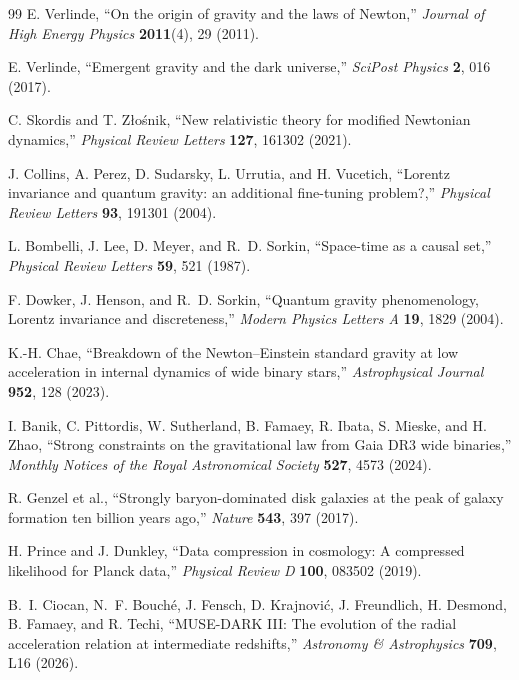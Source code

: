 \documentclass[11pt]{article}
\begin{document}
\begin{thebibliography}{99}
E. Verlinde,
``On the origin of gravity and the laws of Newton,''
\emph{Journal of High Energy Physics} \textbf{2011}(4), 29 (2011).

E. Verlinde,
``Emergent gravity and the dark universe,''
\emph{SciPost Physics} \textbf{2}, 016 (2017).

C. Skordis and T. Z\l{}o\'snik,
``New relativistic theory for modified Newtonian dynamics,''
\emph{Physical Review Letters} \textbf{127}, 161302 (2021).

J. Collins, A. Perez, D. Sudarsky, L. Urrutia, and H. Vucetich,
``Lorentz invariance and quantum gravity: an additional fine-tuning problem?,''
\emph{Physical Review Letters} \textbf{93}, 191301 (2004).

L. Bombelli, J. Lee, D. Meyer, and R.~D. Sorkin,
``Space-time as a causal set,''
\emph{Physical Review Letters} \textbf{59}, 521 (1987).

F. Dowker, J. Henson, and R.~D. Sorkin,
``Quantum gravity phenomenology, Lorentz invariance and discreteness,''
\emph{Modern Physics Letters A} \textbf{19}, 1829 (2004).

K.-H. Chae,
``Breakdown of the Newton--Einstein standard gravity at low acceleration in internal dynamics of wide binary stars,''
\emph{Astrophysical Journal} \textbf{952}, 128 (2023).

I. Banik, C. Pittordis, W. Sutherland, B. Famaey, R. Ibata, S. Mieske, and H. Zhao,
``Strong constraints on the gravitational law from Gaia DR3 wide binaries,''
\emph{Monthly Notices of the Royal Astronomical Society} \textbf{527}, 4573 (2024).

R. Genzel et al.,
``Strongly baryon-dominated disk galaxies at the peak of galaxy formation ten billion years ago,''
\emph{Nature} \textbf{543}, 397 (2017).

H. Prince and J. Dunkley,
``Data compression in cosmology: A compressed likelihood for Planck data,''
\emph{Physical Review D} \textbf{100}, 083502 (2019).

B.~I. Ciocan, N.~F. Bouch\'e, J. Fensch, D. Krajnovi\'c, J. Freundlich, H. Desmond, B. Famaey, and R. Techi,
``MUSE-DARK III: The evolution of the radial acceleration relation at intermediate redshifts,''
\emph{Astronomy \& Astrophysics} \textbf{709}, L16 (2026).


\end{thebibliography}
\end{document}
